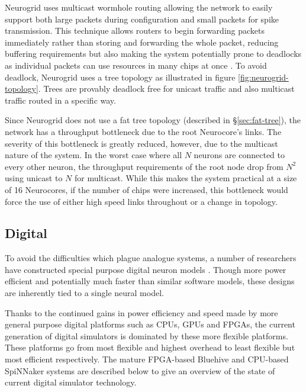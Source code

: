 				Neurogrid uses multicast wormhole routing allowing the network to easily
				support both large packets during configuration and small packets for
				spike transmission. This technique allows routers to begin forwarding
				packets immediately rather than storing and forwarding the whole packet,
				reducing buffering requirements but also making the system potentially
				prone to deadlocks as individual packets can use resources in many chips
				at once \cite{dally04}. To avoid deadlock, Neurogrid uses a tree
				topology as illustrated in figure \ref{fig:neurogrid-topology}. Trees
				are provably deadlock free for unicast traffic and also multicast
				traffic routed in a specific way.
				
				Since Neurogrid does not use a fat tree topology (described in
				\S\ref{sec:fat-tree}), the network has a throughput bottleneck due to
				the root Neurocore's links. The severity of this bottleneck is greatly
				reduced, however, due to the multicast nature of the system. In the
				worst case where all $N$ neurons are connected to every other neuron,
				the throughput requirements of the root node drop from $N^2$ using
				unicast to $N$ for multicast. While this makes the system practical at a
				size of 16 Neurocores, if the number of chips were increased, this
				bottleneck would force the use of either high speed links throughout or
				a change in topology.
			
			
		\subsection{Digital}
			
			
			To avoid the difficulties which plague analogue systems, a number of
			researchers have constructed special purpose digital neuron models
			\cite{prange93,jahnke96,schoenauer99,mehrtash03}. Though more power
			efficient and potentially much faster than similar software models, these
			designs are inherently tied to a single neural model.
			
			Thanks to the continued gains in power efficiency and speed made by more
			general purpose digital platforms such as CPUs, GPUs and FPGAs, the
			current generation of digital simulators is dominated by these more
			flexible platforms. These platforms go from most flexible and highest
			overhead to least flexible but most efficient respectively.  The mature
			FPGA-based Bluehive and CPU-based SpiNNaker systems are described below to
			give an overview of the state of current digital simulator technology.
			
